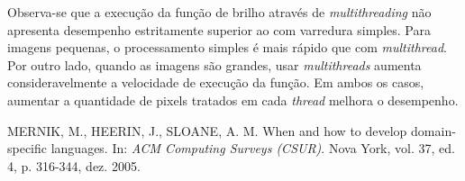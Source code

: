 \documentclass[a4paper, 10pt, conference]{ieeeconf}
\begin{document}

Observa-se que a execução da função de brilho através de \textit{multithreading} não apresenta desempenho estritamente superior ao com varredura simples. Para imagens pequenas, o processamento simples é mais rápido que com \textit{multithread}. Por outro lado, quando as imagens são grandes, usar \textit{multithreads} aumenta consideravelmente a velocidade de execução da função. Em ambos os casos, aumentar a quantidade de pixels tratados em cada \textit{thread} melhora o desempenho.

\begin{thebibliography}{99}

 MERNIK, M., HEERIN, J., SLOANE, A. M. When and how to develop domain-specific languages. In: \textit{ACM Computing Surveys (CSUR)}. Nova York, vol. 37, ed. 4, p. 316-344, dez. 2005.

\end{thebibliography}
\end{document}
